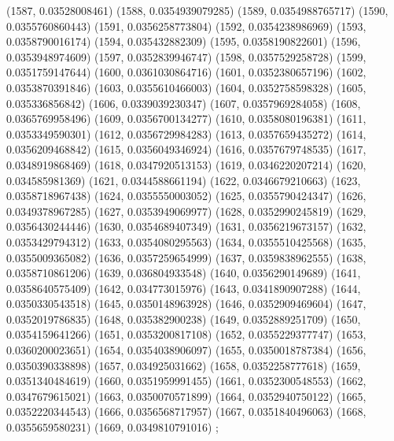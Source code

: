 {					(1587, 0.03528008461)
					(1588, 0.0354939079285)
					(1589, 0.0354988765717)
					(1590, 0.0355760860443)
					(1591, 0.0356258773804)
					(1592, 0.0354238986969)
					(1593, 0.0358790016174)
					(1594, 0.035432882309)
					(1595, 0.0358190822601)
					(1596, 0.0353948974609)
					(1597, 0.0352839946747)
					(1598, 0.0357529258728)
					(1599, 0.0351759147644)
					(1600, 0.0361030864716)
					(1601, 0.0352380657196)
					(1602, 0.0353870391846)
					(1603, 0.0355610466003)
					(1604, 0.0352758598328)
					(1605, 0.035336856842)
					(1606, 0.0339039230347)
					(1607, 0.0357969284058)
					(1608, 0.0365769958496)
					(1609, 0.0356700134277)
					(1610, 0.0358080196381)
					(1611, 0.0353349590301)
					(1612, 0.0356729984283)
					(1613, 0.0357659435272)
					(1614, 0.0356209468842)
					(1615, 0.0356049346924)
					(1616, 0.0357679748535)
					(1617, 0.0348919868469)
					(1618, 0.0347920513153)
					(1619, 0.0346220207214)
					(1620, 0.034585981369)
					(1621, 0.0344588661194)
					(1622, 0.0346679210663)
					(1623, 0.0358718967438)
					(1624, 0.0355550003052)
					(1625, 0.0355790424347)
					(1626, 0.0349378967285)
					(1627, 0.0353949069977)
					(1628, 0.0352990245819)
					(1629, 0.0356430244446)
					(1630, 0.0354689407349)
					(1631, 0.0356219673157)
					(1632, 0.0353429794312)
					(1633, 0.0354080295563)
					(1634, 0.0355510425568)
					(1635, 0.0355009365082)
					(1636, 0.0357259654999)
					(1637, 0.0359838962555)
					(1638, 0.0358710861206)
					(1639, 0.036804933548)
					(1640, 0.0356290149689)
					(1641, 0.0358640575409)
					(1642, 0.034773015976)
					(1643, 0.0341890907288)
					(1644, 0.0350330543518)
					(1645, 0.0350148963928)
					(1646, 0.0352909469604)
					(1647, 0.0352019786835)
					(1648, 0.035382900238)
					(1649, 0.0352889251709)
					(1650, 0.0354159641266)
					(1651, 0.0353200817108)
					(1652, 0.0355229377747)
					(1653, 0.0360200023651)
					(1654, 0.0354038906097)
					(1655, 0.0350018787384)
					(1656, 0.0350390338898)
					(1657, 0.034925031662)
					(1658, 0.0352258777618)
					(1659, 0.0351340484619)
					(1660, 0.0351959991455)
					(1661, 0.0352300548553)
					(1662, 0.0347679615021)
					(1663, 0.0350070571899)
					(1664, 0.0352940750122)
					(1665, 0.0352220344543)
					(1666, 0.0356568717957)
					(1667, 0.0351840496063)
					(1668, 0.0355659580231)
					(1669, 0.0349810791016)
				};
